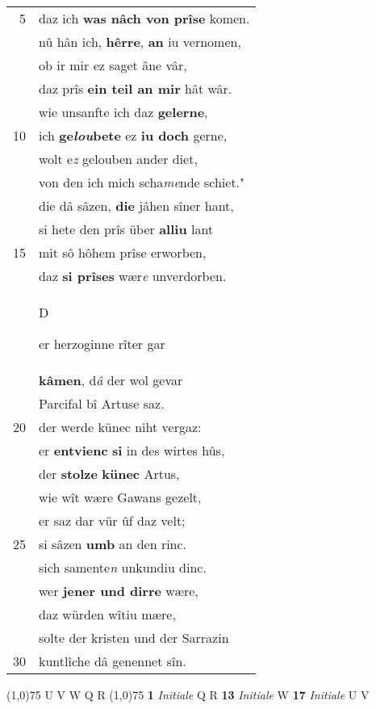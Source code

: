 \documentclass[8pt,a4paper,notitlepage]{article}
\begin{document}
\begin{table}[ht]
\begin{minipage}[t]{0.5\linewidth}
\begin{tabular}{rl}
5 & daz ich \textbf{was nâch von prîse} komen.\\ 
 & nû hân ich, \textbf{hêrre}, \textbf{an} iu vernomen,\\ 
 & ob ir mir ez saget âne vâr,\\ 
 & daz prîs \textbf{ein teil an mir} hât wâr.\\ 
 & wie unsanfte ich daz \textbf{gelerne},\\ 
10 & ich \textbf{ge\textit{lou}bete} ez \textbf{iu doch} gerne,\\ 
 & wolt e\textit{z} gelouben ander diet,\\ 
 & von den ich mich scha\textit{me}nde schiet."\\ 
 & die dâ sâzen, \textbf{die} jâhen sîner hant,\\ 
 & si hete den prîs über \textbf{alliu} lant\\ 
15 & mit sô hôhem prîse erworben,\\ 
 & daz \textbf{si prîses} wær\textit{e} unverdorben.\\ 
 & \begin{large}D\end{large}er herzoginne rîter gar\\ 
 & \textbf{kâmen}, d\textit{â} der wol gevar\\ 
 & Parcifal bî Artuse saz.\\ 
20 & der werde künec niht vergaz:\\ 
 & er \textbf{entvienc} \textbf{si} in des wirtes hûs,\\ 
 & der \textbf{stolze} \textbf{künec} Artus,\\ 
 & wie wît wære Gawans gezelt,\\ 
 & er saz dar vür ûf daz velt;\\ 
25 & si sâzen \textbf{umb} an den rinc.\\ 
 & sich samente\textit{n} unkundiu dinc.\\ 
 & wer \textbf{jener und dirre} wære,\\ 
 & daz würden wîtiu mære,\\ 
 & solte der kristen und der Sarrazin\\ 
30 & kuntlîche dâ genennet sîn.\\ 
\end{tabular}
\scriptsize
\line(1,0){75} \newline
U V W Q R \newline
\line(1,0){75} \newline
\textbf{1} \textit{Initiale} Q R  \textbf{13} \textit{Initiale} W  \textbf{17} \textit{Initiale} U V  \newline

\end{minipage}
\end{table}
\end{document}

